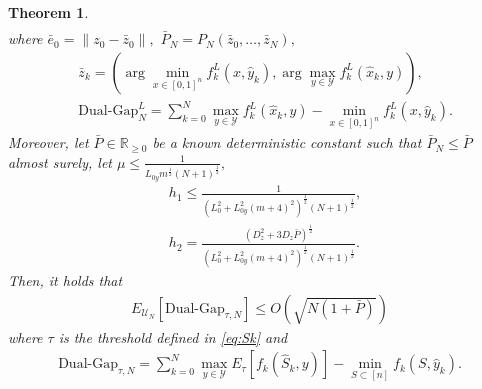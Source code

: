 \documentclass{article}
\theoremstyle{plain}
\newtheorem{theorem}{Theorem}[section]
\theoremstyle{definition}
\theoremstyle{remark}
\newcommand{\R}{\mathbb{R}}
\begin{document}
\begin{theorem}
\begin{align}
   \label{eq:eqon1}
    \end{align}
    where $\bar{e}_0=\|z_0-\bar{z}_0\|,$ $\bar{P}_N=P_N(\bar{z}_0,\dots,\bar{z}_N),$
    \begin{align*}
      &\bar{z}_k=\left(\arg\min_{x\in [0,1]^n} f^L_{k}(x,\hat{y}_k),\arg\max_{y\in \mathcal{Y}} f^L_{k}(\hat{x}_k,y)\right), \\
     &\text{Dual-Gap}_N^L =\sum_{k=0}^N \max_{y\in\mathcal{Y}}f^L_k(\hat{x}_k,y) - \min_{x \in [0,1]^n} f^L_k(x,\hat{y}_k).
    \end{align*}
    Moreover, let $\bar{P}\in\R_{\geq0}$ be a known deterministic constant such that $\bar{P}_N\leq\bar{P}$ almost surely, let $\mu\leq\frac{1}{L_{0y}m^{\frac{1}{2}}(N+1)^{\frac{1}{2}}},$
    \begin{align*}
      &h_1 \leq \frac{1}{( L_0^2+L_{0y}^2(m+4)^2)^\frac{1}{2}(N+1)^\frac{1}{2}}, \\& h_2 = \frac{(D_z^2+3D_z\bar{P})^\frac{1}{2}}{( L_0^2+L_{0y}^2(m+4)^2)^\frac{1}{2}(N+1)^\frac{1}{2}}.
    \end{align*}
Then, it holds that %
    \begin{align}\label{eq:eqon2}
	E_{\mathcal{U}_{N}}[\text{Dual-Gap}_{\tau,N}]\leq O(\sqrt{N(1+\bar{P})})
    \end{align}
    where 
    $\tau$ is the threshold defined in \eqref{eq:Sk} and
    \begin{align*}
        \text{Dual-Gap}_{\tau,N} \!=\! \sum_{k=0}^N \max_{y\in\mathcal{Y}}E_\tau[f_k(\hat{S}_k,y)] \!-\! \min_{S \subset [n]} f_k(S,\hat{y}_k).
    \end{align*}

\end{theorem}
\end{document}
